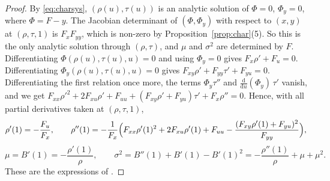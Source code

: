 \documentclass[11pt]{amsart}
\theoremstyle{definition}
\theoremstyle{remark}
\numberwithin{equation}{section}
\newcommand{\dd}{\mathrm{d}}
\begin{document}
\begin{proof}
By \eqref{eq:charsys}, \((\rho(u),\tau(u))\) is an analytic solution of \(\Phi=0\), \(\Phi_y=0\), where \(\Phi=F-y\). The Jacobian determinant of \((\Phi,\Phi_y)\) with respect to \((x,y)\) at \((\rho,\tau,1)\) is \(F_xF_{yy}\), which is non-zero by Proposition~\ref{prop:char}(5). So this is the only analytic solution through \((\rho,\tau)\), and \(\mu\) and \(\sigma^2\) are determined by \(F\). Differentiating \(\Phi(\rho(u),\tau(u),u)=0\) and using \(\Phi_y=0\) gives \(F_x\rho'+F_u=0\). Differentiating \(\Phi_y(\rho(u),\tau(u),u)=0\) gives \(F_{xy}\rho'+F_{yy}\tau'+F_{yu}=0\). Differentiating the first relation once more, the terms \(\Phi_y\tau''\) and \(\frac{\dd}{\dd u}(\Phi_y)\,\tau'\) vanish, and we get \(F_{xx}\rho'^2+2F_{xu}\rho'+F_{uu}+(F_{xy}\rho'+F_{yu})\tau'+F_x\rho''=0\). Hence, with all partial derivatives taken at \((\rho,\tau,1)\),
\begin{equation}\label{eq:rho12}
\rho'(1)=-\frac{F_u}{F_x},\qquad\rho''(1)=-\frac1{F_x}\Bigl(F_{xx}\rho'(1)^2+2F_{xu}\rho'(1)+F_{uu}-\frac{(F_{xy}\rho'(1)+F_{yu})^2}{F_{yy}}\Bigr),
\end{equation}
\begin{equation}\label{eq:musigma}
\mu=B'(1)=-\frac{\rho'(1)}{\rho},\qquad\sigma^2=B''(1)+B'(1)-B'(1)^2=-\frac{\rho''(1)}{\rho}+\mu+\mu^2 .
\end{equation}
These are the expressions of \cite[Thm.~2.23]{Dr}.
\end{proof}
\end{document}

